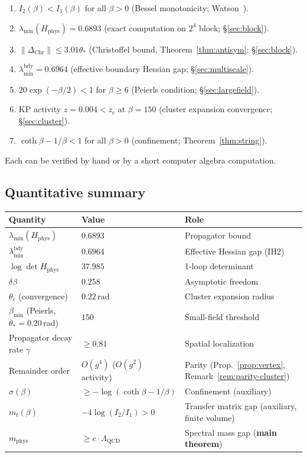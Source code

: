 \documentclass[11pt]{article}
\theoremstyle{definition}
\newcommand{\Lam}{\Lambda_{\mathrm{QCD}}}
\begin{document}
\begin{enumerate}
\item $I_2(\beta)<I_1(\beta)$ for all $\beta>0$
(Bessel monotonicity; Watson~\cite{Watson44}).
\item $\lambda_{\min}(H_{\mathrm{phys}})=0.6893$
(exact computation on $2^4$ block; \S\ref{sec:block}).
\item $\|\Delta_{\mathrm{Chr}}\|\le 3.01\theta_*$ (Christoffel bound, Theorem~\ref{thm:antisym};
\S\ref{sec:block}).
\item $\lambda_{\min}^{\mathrm{bdy}}=0.6964$ (effective boundary
Hessian gap; \S\ref{sec:multiscale}).
\item $20\exp(-\beta/2)<1$ for $\beta\ge 6$ (Peierls condition;
\S\ref{sec:largefield}).
\item KP activity $z=0.004<z_c$ at $\beta=150$ (cluster expansion
convergence; \S\ref{sec:cluster}).
\item $\coth\beta-1/\beta<1$ for all $\beta>0$
(confinement; Theorem~\ref{thm:string}).
\end{enumerate}

Each can be verified by hand or by a short computer algebra
computation.

\subsection{Quantitative summary}

\begin{center}
\begin{tabular}{lll}
\toprule
\textbf{Quantity} & \textbf{Value} & \textbf{Role}\\
\midrule
$\lambda_{\min}(H_{\mathrm{phys}})$ & $0.6893$ & Propagator bound\\
$\lambda_{\min}^{\mathrm{bdy}}$ & $0.6964$ & Effective Hessian gap (IH2)\\
$\log\det H_{\mathrm{phys}}$ & $37.985$ & 1-loop determinant\\
$\delta\beta$ & $0.258$ & Asymptotic freedom\\
$\theta_c$ (convergence) & $0.22$\,rad & Cluster expansion radius\\
$\beta_{\min}$ (Peierls, $\theta_*{=}0.20$\,rad) & $150$ &
Small-field threshold\\
Propagator decay rate $\gamma$ & $\ge 0.81$ & Spatial localization\\
Remainder order & $O(g^4)$ ($O(g^2)$ activity) & Parity (Prop.~\ref{prop:vertex},
Remark~\ref{rem:parity-cluster})\\
$\sigma(\beta)$ & $\ge-\log(\coth\beta-1/\beta)$ &
Confinement (auxiliary)\\
$m_t(\beta)$ & $-4\log(I_2/I_1)>0$ & Transfer matrix gap
(auxiliary, finite volume)\\
$m_{\mathrm{phys}}$ & $\ge c\cdot\Lam$ &
Spectral mass gap (\textbf{main theorem})\\
\bottomrule
\end{tabular}
\end{center}
\end{document}
